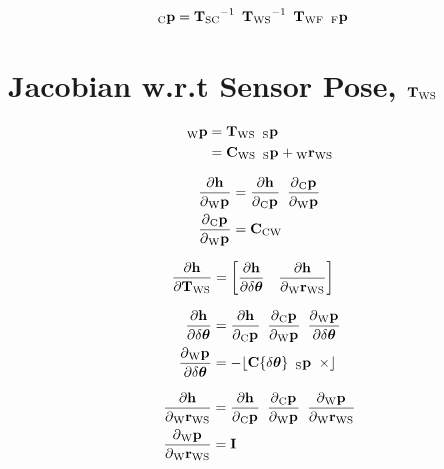 \begin{align}
  \Point{\cam}{\fiducial_{ij}}
  &=
  \Tf{\sensor}{\cam}^{-1}
  \enspace
  \Tf{\world}{\sensor}^{-1}
  \enspace
  \Tf{\world}{\fiducial}
  \enspace \Point{\fiducial}{\fiducial_{ij}}
\end{align}



\section{Jacobian w.r.t Sensor Pose, $\Tf{\world}{\sensor}$}

\begin{align}
  \Point{\world}{\fiducial_{ij}}
  &=
    \Tf{\world}{\sensor}
    \enspace \Pt{\sensor} \\
  &=
    \Rot{\world}{\sensor}
    \enspace \Pt{\sensor}
		+ \Pos{\world}{\sensor}
\end{align}

\begin{align}
  \dfrac{\partial{\projFunc}}{\partial{\Pt{\world}}}
		&= \dfrac{\partial{\projFunc}}{\partial{\Pt{\cam}}}
			 \enspace
			 \dfrac{\partial{\Pt{\cam}}}{\partial{\Pt{\world}}} \\
  \dfrac{\partial{\Pt{\cam}}}{\partial{\Pt{\world}}}
		&= \Rot{\cam}{\world}
\end{align}

\begin{align}
  \dfrac{\partial{\projFunc}}{\partial{\Tf{\world}{\sensor}}}
    &=
		\begin{bmatrix}
			\dfrac{\partial{\projFunc}}{\partial{\dtheta}}
			\quad
			\dfrac{\partial{\projFunc}}{\partial{\Pos{\world}{\sensor}}}
		\end{bmatrix}
\end{align}

\begin{align}
  \dfrac{\partial{\projFunc}}{\partial{\dtheta}}
    &= \dfrac{\partial{\projFunc}}{\partial{\Pt{\cam}}}
			 \enspace
       \dfrac{\partial{\Pt{\cam}}}{\partial{\Pt{\world}}}
			 \enspace
       \dfrac{\partial{\Pt{\world}}}{\partial{\dtheta}} \\
	\dfrac{\partial{\Pt{\world}}}{\partial{\dtheta}}
    &= -\Skew{\rot\{\dtheta\} \enspace \Pt{\sensor}}
\end{align}

\begin{align}
  \dfrac{\partial{\projFunc}}{\partial{\Pos{\world}{\sensor}}}
    &= \dfrac{\partial{\projFunc}}{\partial{\Pt{\cam}}}
			 \enspace
       \dfrac{\partial{\Pt{\cam}}}{\partial{\Pt{\world}}}
			 \enspace
       \dfrac{\partial{\Pt{\world}}}{\partial{\Pos{\world}{\sensor}}} \\
	\dfrac{\partial{\Pt{\world}}}{\partial{\Pos{\world}{\sensor}}}
		&= \I
\end{align}


